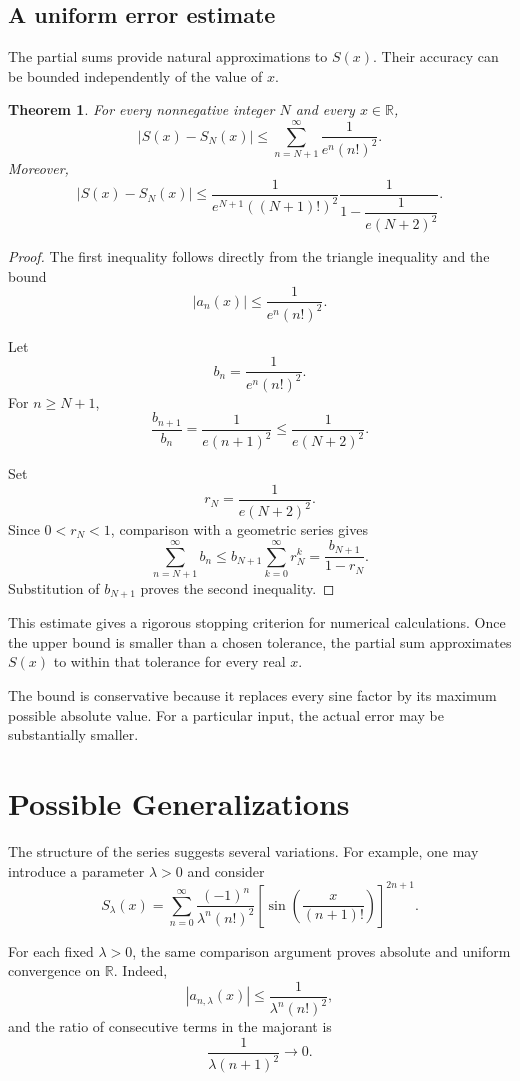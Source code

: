 \documentclass[12pt]{article}
\newtheorem{theorem}{Theorem}[section]
\theoremstyle{definition}
\theoremstyle{remark}
\begin{document}
\subsection{A uniform error estimate}

The partial sums provide natural approximations to \(S(x)\).
Their accuracy can be bounded independently of the value
of \(x\).

\begin{theorem}
For every nonnegative integer \(N\) and every
\(x\in\mathbb{R}\),
\[
|S(x)-S_N(x)|
\leq
\sum_{n=N+1}^{\infty}
\frac{1}{e^n(n!)^2}.
\]
Moreover,
\[
|S(x)-S_N(x)|
\leq
\frac{1}{e^{N+1}((N+1)!)^2}
\frac{1}{1-\dfrac{1}{e(N+2)^2}}.
\]
\end{theorem}

\begin{proof}
The first inequality follows directly from the triangle
inequality and the bound
\[
|a_n(x)|\leq\frac{1}{e^n(n!)^2}.
\]

Let
\[
b_n=\frac{1}{e^n(n!)^2}.
\]
For \(n\geq N+1\),
\[
\frac{b_{n+1}}{b_n}
=\frac{1}{e(n+1)^2}
\leq\frac{1}{e(N+2)^2}.
\]

Set
\[
r_N=\frac{1}{e(N+2)^2}.
\]
Since \(0<r_N<1\), comparison with a geometric series gives
\[
\sum_{n=N+1}^{\infty}b_n
\leq b_{N+1}\sum_{k=0}^{\infty}r_N^k
=\frac{b_{N+1}}{1-r_N}.
\]
Substitution of \(b_{N+1}\) proves the second inequality.
\end{proof}

This estimate gives a rigorous stopping criterion for
numerical calculations. Once the upper bound is smaller
than a chosen tolerance, the partial sum approximates
\(S(x)\) to within that tolerance for every real \(x\).

The bound is conservative because it replaces every sine
factor by its maximum possible absolute value. For a
particular input, the actual error may be substantially
smaller.

\section{Possible Generalizations}

The structure of the series suggests several variations.
For example, one may introduce a parameter \(\lambda>0\)
and consider
\[
S_{\lambda}(x)=
\sum_{n=0}^{\infty}
\frac{(-1)^n}{\lambda^n(n!)^2}
\left[
\sin\left(\frac{x}{(n+1)!}\right)
\right]^{2n+1}.
\]

For each fixed \(\lambda>0\), the same comparison argument
proves absolute and uniform convergence on \(\mathbb{R}\).
Indeed,
\[
|a_{n,\lambda}(x)|
\leq\frac{1}{\lambda^n(n!)^2},
\]
and the ratio of consecutive terms in the majorant is
\[
\frac{1}{\lambda(n+1)^2}\longrightarrow 0.
\]
\end{document}
